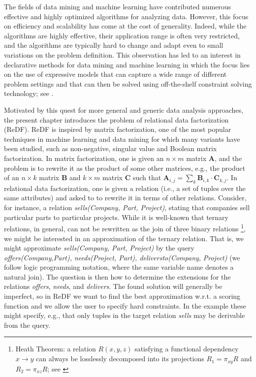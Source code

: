 The fields of data mining and machine learning have contributed numerous effective and highly optimized algorithms for analyzing data. 
However, this  focus on efficiency and scalability has come at the cost of generality. 
Indeed, while the algorithms are highly effective, their application range is often very restricted, 
and the algorithms are typically hard to change and adapt even to small variations on the problem definition.
This observation has led to an interest in declarative methods for data mining and machine learning in which the focus lies on 
the use of expressive models that can capture a wide range of different problem settings
and that can then be solved using off-the-shelf constraint solving technology; see \textcite{miningZinc,DeRaedtECML12,DMWorkshop,DeRaedtAAAI15}.

Motivated by this quest for more general and generic data analysis approaches, 
the present chapter introduces the problem of relational data factorization (ReDF). ReDF is inspired by matrix factorization, one of the most popular techniques in machine learning and data mining
for which many variants have been studied, such as non-negative, singular value and Boolean matrix factorization. 
In matrix factorization, one is given an $n \times m$ matrix $\mathbf{A}$, and the problem is to rewrite it
as the product of some other matrices, e.g., the product of an $n \times  k$ matrix $\mathbf{B}$ and $k\times m$ matrix $\mathbf{C}$
such that ${\mathbf{A}_{i,j} = \sum_k \mathbf{B}_{i,k} \cdot  \mathbf{C}_{k,j}}$.  
In relational data factorization, one is given a relation (i.e., a set of tuples over the same attributes) and asked to
to rewrite it in terms of other relations.  Consider, for instance, a relation
\textit{sells(Company, Part, Project)}, stating that companies sell particular parts to particular projects.
While it is well-known that ternary relations, in general, can not be rewritten
as the join of three binary relations \parencite{heath_theorem, ternary_decomposition}\footnote{Heath Theorem: a relation $R(x,y,z)$ satisfying a functional dependency $x \rightarrow y$ can always be losslessly decomposed into its projections $R_1=\pi_{xy}R$ and $R_2=\pi_{xz}R$; see \parencite[Table 5]{ternary_decomposition}}, we might be interested in an approximation of 
the ternary relation. That is, we might approximate \textit{sells(Company, Part, Project)} 
by the query \textit{offers(Company,Part), needs(Project, Part), deliversto(Company,} \textit{Project)} (we follow logic programming notation, where the same variable name denotes a natural join).
The question is then how to determine the extensions for the relations \textit{offers}, \textit{needs}, and \textit{delivers}.
The found solution will generally be imperfect, so in ReDF we want to find the best approximation w.r.t. a scoring function and we allow the user to specify hard constraints. In the example these might specify, e.g., that only tuples in the target relation \textit{sells} may be derivable from the query. 

